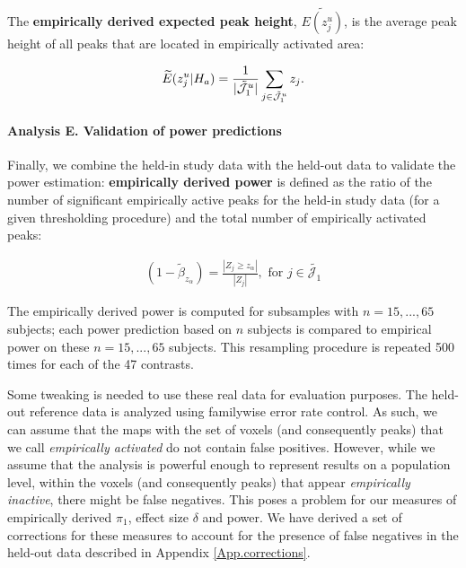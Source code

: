 The \textbf{empirically derived expected peak height}, $\widetilde{E(z_j^u)}$, is the average peak height of all peaks that are located in empirically activated area:

\begin{align}
\widetilde{E}(z_j^u|H_a) =  \frac{1}{|\tilde{\cal J}_1^u|}\sum_{j\in \tilde{\cal J}_1^u} z_j.
\end{align}

\paragraph{Analysis E. Validation of power predictions} Finally, we combine the held-in study data with the held-out data to validate the power estimation: \textbf{empirically derived power} is defined as the ratio of the number of significant empirically active peaks for the held-in study data (for a given thresholding procedure) and the total number of empirically activated peaks:

\begin{align}
(1-\widetilde{\beta}_{z_\alpha}) = \frac{|Z_j \geq z_\alpha|}{|Z_j|}, \text{ for } j \in \tilde{\mathcal{J}_1} \label{powerHCP}
\end{align}


The empirically derived power is computed for subsamples with $n=15,...,65$ subjects; each power prediction based on $n$ subjects is compared to empirical power on these $n=15,...,65$ subjects.  This resampling procedure is repeated 500 times for each of the 47 contrasts.

Some tweaking is needed to use these real data for evaluation purposes.   The held-out reference data is analyzed using familywise error rate control.  As such, we can assume that the maps with the set of voxels (and consequently peaks) that we call \emph{empirically activated} do not contain false positives.  However, while we assume that the analysis is powerful enough to represent results on a population level, within the voxels (and consequently peaks) that appear \emph{empirically inactive}, there might be false negatives. This poses a problem for our measures of empirically derived $\pi_1$, effect size $\delta$ and power.  We have derived a set of corrections for these measures to account for the presence of false negatives in the held-out data described in Appendix \ref{App.corrections}.


